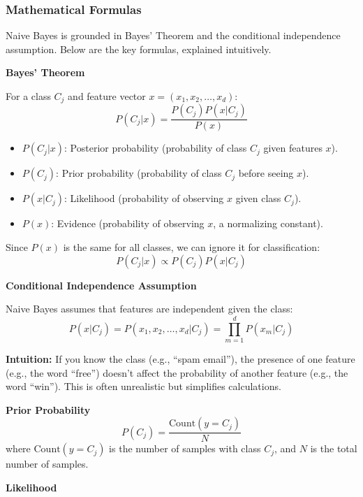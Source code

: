 \subsubsection{Mathematical Formulas}\text{}

\smallskip
Naive Bayes is grounded in Bayes' Theorem and the conditional independence assumption.
Below are the key formulas, explained intuitively.

\textbf{Bayes' Theorem}

For a class $C_j$ and feature vector $x = (x_1, x_2, \dots, x_d)$:
\[P(C_j | x) = \frac{P(C_j) P(x | C_j)}{P(x)}\]

\begin{itemize}[leftmargin=*] %
    \item $P(C_j | x)$: Posterior probability (probability of class $C_j$ given features $x$).
    \item $P(C_j)$: Prior probability (probability of class $C_j$ before seeing $x$).
    \item $P(x | C_j)$: Likelihood (probability of observing $x$ given class $C_j$).
    \item $P(x)$: Evidence (probability of observing $x$, a normalizing constant).
\end{itemize}

Since $P(x)$ is the same for all classes, we can ignore it for classification:
\[P(C_j | x) \propto P(C_j) P(x | C_j)\]

\textbf{Conditional Independence Assumption}

Naive Bayes assumes that features are independent given the class:
\[P(x | C_j) = P(x_1, x_2, \ldots, x_d | C_j) = \prod_{m=1}^d P(x_m | C_j)\]

\textbf{Intuition:} If you know the class (e.g., ``spam email''), the presence of one feature (e.g., the word ``free'') doesn't affect the probability of another feature (e.g., the word ``win'').
This is often unrealistic but simplifies calculations.

\smallskip
\textbf{Prior Probability}
\[P(C_j) = \frac{\text{Count}(y = C_j)}{N}\]
where $\text{Count}(y = C_j)$ is the number of samples with class $C_j$, and $N$ is the total number of samples.

\smallskip
\textbf{Likelihood}

